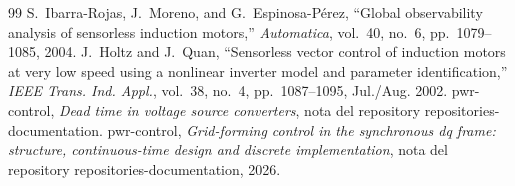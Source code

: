 \documentclass[10pt,a4paper]{scrartcl}
\begin{document}
\begin{thebibliography}{99}
 S.~Ibarra-Rojas, J.~Moreno, and G.~Espinosa-Pérez, ``Global observability analysis of sensorless induction motors,'' \emph{Automatica}, vol.~40, no.~6, pp.~1079--1085, 2004.
 J.~Holtz and J.~Quan, ``Sensorless vector control of induction motors at very low speed using a nonlinear inverter model and parameter identification,'' \emph{IEEE Trans. Ind. Appl.}, vol.~38, no.~4, pp.~1087--1095, Jul./Aug. 2002.
 pwr-control, \emph{Dead time in voltage source converters}, nota  del repository repositories-documentation.
 pwr-control, \emph{Grid-forming control in the synchronous dq frame: structure, continuous-time design and discrete implementation}, nota  del repository repositories-documentation, 2026.
\end{thebibliography}
\end{document}
